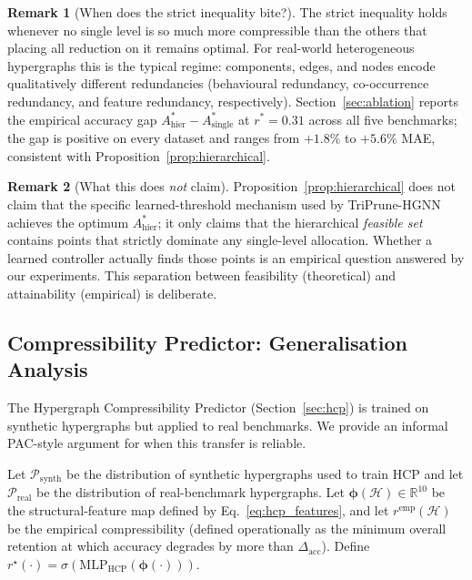 \documentclass[10pt]{article}
\theoremstyle{plain}
\theoremstyle{definition}
\newtheorem{remark}{Remark}
\begin{document}
\begin{remark}[When does the strict inequality bite?]
The strict inequality holds whenever no single level is so much
more compressible than the others that placing all reduction on
it remains optimal. For real-world heterogeneous hypergraphs this
is the typical regime: components, edges, and nodes encode
qualitatively different redundancies (behavioural redundancy,
co-occurrence redundancy, and feature redundancy, respectively).
Section~\ref{sec:ablation} reports the empirical accuracy gap
$A_{\mathrm{hier}}^{\!*} - A_{\mathrm{single}}^{\!*}$ at
$r^{\!*}=0.31$ across all five benchmarks; the gap is positive on
every dataset and ranges from $+1.8\%$ to $+5.6\%$ MAE, consistent
with Proposition~\ref{prop:hierarchical}.
\end{remark}

\begin{remark}[What this does \emph{not} claim]
Proposition~\ref{prop:hierarchical} does not claim that the
specific learned-threshold mechanism used by TriPrune-HGNN
achieves the optimum $A^{\!*}_{\mathrm{hier}}$; it only claims
that the hierarchical \emph{feasible set} contains points that
strictly dominate any single-level allocation. Whether a learned
controller actually finds those points is an empirical question
answered by our experiments. This separation between feasibility
(theoretical) and attainability (empirical) is deliberate.
\end{remark}

\subsection{Compressibility Predictor: Generalisation Analysis}
\label{sec:hcp_theory}

The Hypergraph Compressibility Predictor (Section~\ref{sec:hcp}) is
trained on synthetic hypergraphs but applied to real benchmarks.
We provide an informal PAC-style argument for when this transfer
is reliable.

Let $\mathcal{P}_{\mathrm{synth}}$ be the distribution of synthetic
hypergraphs used to train HCP and let $\mathcal{P}_{\mathrm{real}}$
be the distribution of real-benchmark hypergraphs. Let
$\boldsymbol{\phi}(\mathcal{H})\in\mathbb{R}^{10}$ be the
structural-feature map defined by Eq.~\eqref{eq:hcp_features}, and
let $r^{\mathrm{emp}}(\mathcal{H})$ be the empirical
compressibility (defined operationally as the minimum overall
retention at which accuracy degrades by more than
$\Delta_{\mathrm{acc}}$). Define $r^\star(\cdot)=
\sigma(\mathrm{MLP}_{\mathrm{HCP}}(\boldsymbol{\phi}(\cdot)))$.
\end{document}
